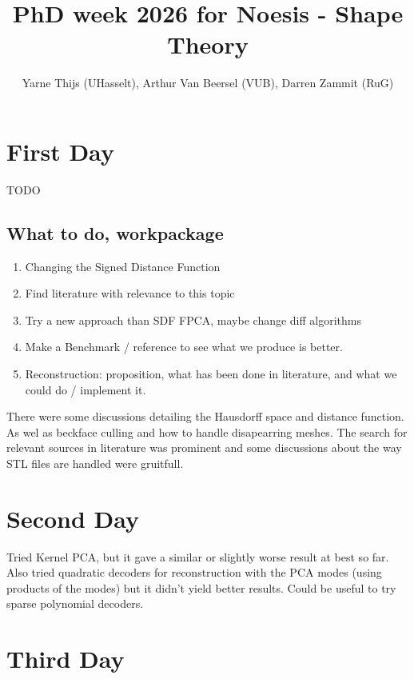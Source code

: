 \documentclass{article}
\title{PhD week 2026 for Noesis - Shape Theory}
\author{Yarne Thijs (UHasselt), Arthur Van Beersel (VUB), Darren Zammit (RuG) \kleur{Please fill in your name here!}}
\begin{document}
\maketitle \vfill \tableofcontents \newpage


\section{First Day}

    TODO


    \subsection{What to do, workpackage}

        \begin{enumerate}
            \item Changing the Signed Distance Function
            \item Find literature with relevance to this topic
            \item Try a new approach than SDF FPCA, maybe change diff algorithms
            \item Make a Benchmark / reference to see what we produce is better.
            \item Reconstruction: proposition, what has been done in literature, and what we could do / implement it.
        \end{enumerate}

    There were some discussions detailing the Hausdorff space and distance function. As wel as beckface culling and how to handle disapearring meshes. The search for relevant sources in literature was prominent and some discussions about the way STL files are handled were gruitfull.

\section{Second Day}

Tried Kernel PCA, but it gave a similar or slightly worse result at best so far. Also tried quadratic decoders for reconstruction with the PCA modes (using products of the modes) but it didn't yield better results. Could be useful to try sparse polynomial decoders.

\section{Third Day}
\end{document}
